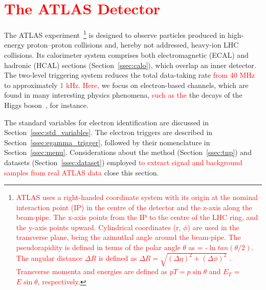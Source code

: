 \chapter{\textcolor{red}{The ATLAS Detector}}\label{sec:context}



The ATLAS experiment~\cite{PERF-2007-01}\footnote{\textcolor{red}{ATLAS uses a right-handed coordinate system with its origin at the nominal interaction point (IP) in the centre of the detector and the z-axis along the beam-pipe. The x-axis points from the IP to the centre of the LHC ring, and the y-axis points upward. Cylindrical coordinates (r, $\phi$) are used in the transverse plane, \phi being the azimuthal angle around the beam-pipe. The pseudorapidity is defined in terms of the polar angle $\theta$ as \eta = -$\ln{tan(\theta/2)}$. The angular distance $\Delta R$ is defined as $\Delta R = \sqrt{(\Delta\eta)^{2} + (\Delta\phi)^{2}}$ . Transverse momenta and energies are defined as $pT = p\sin\theta$ and $E_{T}$ = $E\sin\theta$, respectively}.} is designed to observe particles
produced in high-energy proton--proton collisions and, hereby not addressed,
heavy-ion LHC collisions. Its calorimeter system comprises both 
electromagnetic (ECAL) and hadronic (HCAL)
sections (Section~\ref{ssec:calo}), which overlap an inner detector. The two-level triggering system reduces the total
data-taking rate \textcolor{red}{from 40 MHz} to approximately \textcolor{red}{1 kHz. Here}, we focus on electron-based channels, which are
found in many interesting physics phenomena, \textcolor{red}{such as the} the decays of the Higgs
boson~\cite{HIGG-2012-27,HIGG-2016-33}, for instance.



The standard variables for electron identification are discussed in
Section~\ref{ssec:std_variables}. The electron triggers are described in
Section~\ref{ssec:egamma_trigger}, followed by their nomenclature in
Section~\ref{ssec:menu}.  Considerations about the \TnP method
(Section~\ref{ssec:tnp}) and datasets (Section~\ref{ssec:dataset}) employed \textcolor{red}{to extract signal and background samples
from real ATLAS data} close this section.





